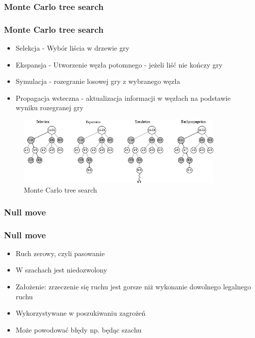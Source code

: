 \documentclass[polish,envcountsect,10pt]{beamer}
\begin{document}
            \subsubsection{Monte Carlo tree search}
                \begin{frame}
                    \frametitle{Monte Carlo tree search}
                    \begin{itemize}
                        \item<1-> Selekcja - Wybór liścia w drzewie gry
                        \item<2-> Ekspansja - Utworzenie węzła potomnego - jeżeli liść nie kończy gry
                        \item<3-> Symulacja - rozegranie losowej gry z wybranego węzła
                        \item<4-> Propagacja wsteczna - aktualizacja informacji w węzłach na podstawie wyniku rozegranej gry                         
                    \end{itemize}
                    
                    \begin{figure}[H]
                        \centering
                        \includegraphics[width=0.9\textwidth]{images/mcts}
                        \caption{Monte Carlo tree search}
                    \end{figure}
                    
                \end{frame}
            \subsubsection{Null move}
            \begin{frame}
                \frametitle{Null move}
                \begin{itemize}
                    \item<1-> Ruch zerowy, czyli pasowanie
                    \item<2-> W szachach jest niedozwolony
                    \item<3-> Założenie: zrzeczenie się ruchu jest gorsze niż wykonanie dowolnego legalnego ruchu
                    \item<4-> Wykorzystywane w poszukiwaniu zagrożeń
                    \item<5-> Może powodować błędy np. będąc szachu
                \end{itemize}
            \end{frame}
\end{document}
